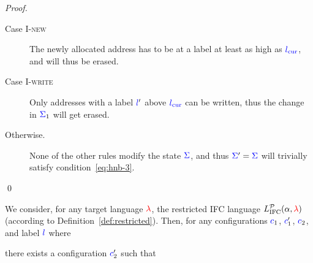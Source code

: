 \documentclass{llncs}
\newcommand{\Red}[1]{{\color{red} #1}}
\begin{document}
\begin{proof}
\begin{description}
    \item[Case \textsc{I-new}] The newly allocated address has to be at a
    label at least as high as \ensuremath{\lcurr}, and will thus be erased.
    \item[Case \textsc{I-write}] Only addresses with a label \ensuremath{\ifc{l}'} above
    \ensuremath{\lcurr} can be written, thus the change in \ensuremath{\ifc{\Sigma}_{1}} will get erased.
    \item[Otherwise.]  None of the other rules modify the state \ensuremath{\ifc{\Sigma}}, and
    thus \ensuremath{\ifc{\Sigma}'\mathrel{=}\ifc{\Sigma}} will trivially satisfy condition~\eqref{eq:hnb-3}.
  \end{description}
  \qed
\end{proof}

\begin{lemma}
  \label{lemma:rr-tsni-general}
  We consider, for any target language \ensuremath{\Red{\lambda}},
  the restricted IFC language \ensuremath{L_\text{IFC}^{\mathcal{P}}(\alpha,\Red{\lambda})}
  (according to Definition~\ref{def:restricted}).
  Then,
  for any configurations \ensuremath{\ifc{c}_{1}}, \ensuremath{\ifc{c}_{1}'}, \ensuremath{\ifc{c}_{2}}, and label \ensuremath{\ifc{l}} where
  
  there exists a configuration \ensuremath{\ifc{c}_{2}'} such that
  
\end{lemma}
\end{document}
